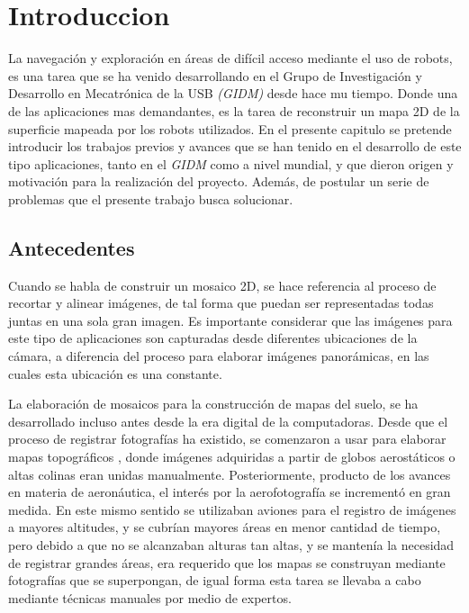 \chapter{Introduccion}
\label{capitulo1}

La navegación y exploración en áreas de difícil acceso mediante el uso de robots, es una tarea que se ha venido desarrollando en el Grupo de Investigación y Desarrollo en Mecatrónica de la USB  \textit{(GIDM)} desde hace mu tiempo. Donde una de las aplicaciones mas demandantes, es la tarea de reconstruir un mapa 2D de la superficie mapeada por los robots utilizados. En el presente capitulo se pretende introducir los trabajos previos y avances que se han tenido en el desarrollo de este tipo aplicaciones, tanto en el \textit{GIDM} como a nivel mundial, y que dieron origen y motivación para la realización del proyecto. Además, de postular un serie de problemas que el presente trabajo busca solucionar.

\section{Antecedentes}

Cuando se habla de construir un mosaico 2D, se hace referencia al proceso de recortar y alinear imágenes, de tal forma que puedan ser representadas todas juntas en una sola gran imagen. Es importante considerar que las imágenes para este tipo de aplicaciones son capturadas desde diferentes ubicaciones de la cámara, a diferencia del proceso para elaborar imágenes panorámicas, en las cuales esta ubicación es una constante. 

La elaboración de mosaicos para la construcción de mapas del suelo, se ha desarrollado incluso antes desde la era digital de la computadoras. Desde que el proceso de registrar fotografías ha existido, se comenzaron a usar para elaborar mapas topográficos \cite{primeros-mapas}, donde imágenes adquiridas a partir de globos aerostáticos o altas colinas eran unidas manualmente. Posteriormente, producto de los avances en materia de aeronáutica, el interés por la aerofotografía se incrementó en gran medida. En este mismo sentido se utilizaban aviones para el registro de imágenes a mayores altitudes, y se cubrían mayores áreas en menor cantidad de tiempo, pero debido a que no se alcanzaban alturas tan altas, y se mantenía la necesidad de registrar grandes áreas, era requerido que los mapas se construyan mediante fotografías que se superpongan, de igual forma esta tarea se llevaba a cabo mediante técnicas manuales por medio de expertos.


